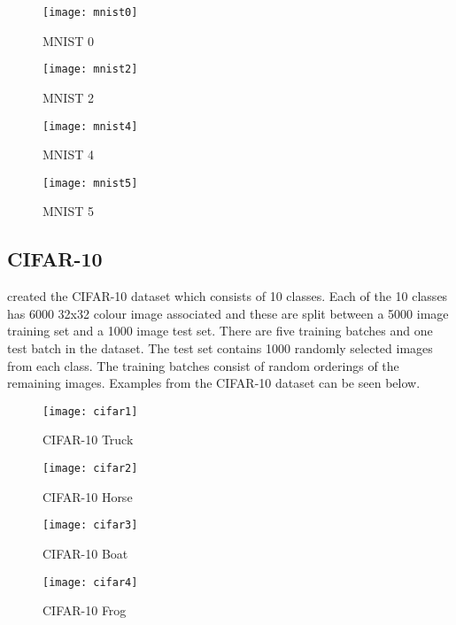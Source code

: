 \begin{figure}[h] 
  \label{mnistDataset} 
  \begin{minipage}[b]{0.25\linewidth}
    \centering
    \texttt{[image: mnist0]} 
    \caption{MNIST 0} 
    \vspace{4ex}
  \end{minipage}%
  \begin{minipage}[b]{0.25\linewidth}
    \centering
    \texttt{[image: mnist2]} 
    \caption{MNIST 2} 
  \label{fig:page2}
    \vspace{4ex}
  \end{minipage} 
  \begin{minipage}[b]{0.25\linewidth}
    \centering
    \texttt{[image: mnist4]} 
    \caption{MNIST 4} 
    \vspace{4ex}
  \end{minipage}%
  \begin{minipage}[b]{0.25\linewidth}
    \centering
    \texttt{[image: mnist5]} 
    \caption{MNIST 5} 
    \vspace{4ex}
  \end{minipage} 
\end{figure}

\tocless\subsection{CIFAR-10}
\parencite{cifar} created the CIFAR-10 dataset which consists of 10 classes.
Each of the 10 classes has 6000 32x32 colour image associated and these are split between a 5000 image training set and a 1000 image test set.
There are five training batches and one test batch in the dataset.
The test set contains 1000 randomly selected images from each class.
The training batches consist of random orderings of the remaining images.
Examples from the CIFAR-10 dataset can be seen below.

\begin{figure}[h] 
  \label{cifar10} 
  \begin{minipage}[b]{0.25\linewidth}
    \centering
    \texttt{[image: cifar1]} 
    \caption{CIFAR-10 Truck} 
    \vspace{4ex}
  \end{minipage}%
  \begin{minipage}[b]{0.25\linewidth}
    \centering
    \texttt{[image: cifar2]} 
    \caption{CIFAR-10 Horse} 
  \label{fig:page2}
    \vspace{4ex}
  \end{minipage} 
  \begin{minipage}[b]{0.25\linewidth}
    \centering
    \texttt{[image: cifar3]} 
    \caption{CIFAR-10 Boat} 
    \vspace{4ex}
  \end{minipage}%
  \begin{minipage}[b]{0.25\linewidth}
    \centering
    \texttt{[image: cifar4]} 
    \caption{CIFAR-10 Frog} 
    \vspace{4ex}
  \end{minipage} 
\end{figure}
